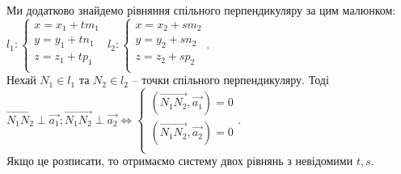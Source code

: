 \documentclass[a4paper, 10pt]{extarticle}
\theoremstyle{theoremdd}
\theoremstyle{theoremdd}
\theoremstyle{theoremdd}
\theoremstyle{theoremdd}
\theoremstyle{theoremdd}
\theoremstyle{theoremdd}
\theoremstyle{theoremdd}
\theoremstyle{theoremdd}
\begin{document}
Ми додатково знайдемо рівняння спільного перпендикуляру за цим малюнком:\\
$l_1: \begin{cases}
x = x_1 + tm_1 \\
y = y_1 + tn_1 \\
z = z_1 + tp_1 \\
\end{cases}$ \hspace{1cm}
$l_2: \begin{cases}
x = x_2 + sm_2 \\
y = y_2 + sn_2 \\
z = z_2 + sp_2 \\
\end{cases}$.
\\
Нехай $N_1 \in l_1$ та $N_2 \in l_2$ -- точки спільного перпендикуляру. Тоді $\overrightarrow{N_1 N_2} \perp \vec{a_1}; \overrightarrow{N_1 N_2} \perp \vec{a_2} \iff \begin{cases}
 (\overrightarrow{N_1 N_2}, \vec{a_1}) = 0\\
 (\overrightarrow{N_1 N_2}, \vec{a_2}) = 0\\
 \end{cases}$.\\
Якщо це розписати, то отримаємо систему двох рівнянь з невідомими $t,s$.

\iffalse
\end{document}
